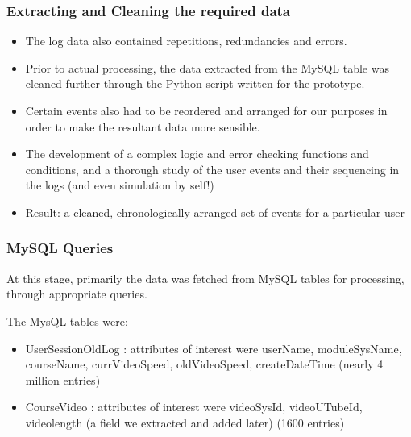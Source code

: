 \documentclass[12pt,xcolor=dvipsnames]{beamer}
\begin{document}
\begin{frame}[t]
\frametitle{Extracting and Cleaning the required data}

\begin{itemize}

\item The log data also contained repetitions, redundancies and errors.
\item Prior to actual processing, the data extracted from the MySQL table was cleaned further through the Python script written for the prototype.
\item Certain events also had to be reordered and arranged for our purposes in order to make the resultant data more sensible.

\item The development of a complex logic and error checking functions and conditions, and a thorough study of the user events and their sequencing in the logs (and even simulation by self!)

\item Result: a cleaned, chronologically arranged set of events for a particular user


\end{itemize}

\end{frame}


\begin{frame}[t]
\frametitle{MySQL Queries}

\vfill
At this stage, primarily the data was fetched from MySQL tables for processing, through appropriate queries.

The MysQL tables were:
\begin{itemize}
\vfill
\item UserSessionOldLog : attributes of interest were userName, moduleSysName, courseName, currVideoSpeed, oldVideoSpeed, createDateTime     (nearly 4 million entries)
\vfill
\item CourseVideo : attributes of interest were videoSysId, videoUTubeId, videolength (a field we extracted and added later) (1600 entries)

\end{itemize}

\end{frame}
\end{document}
